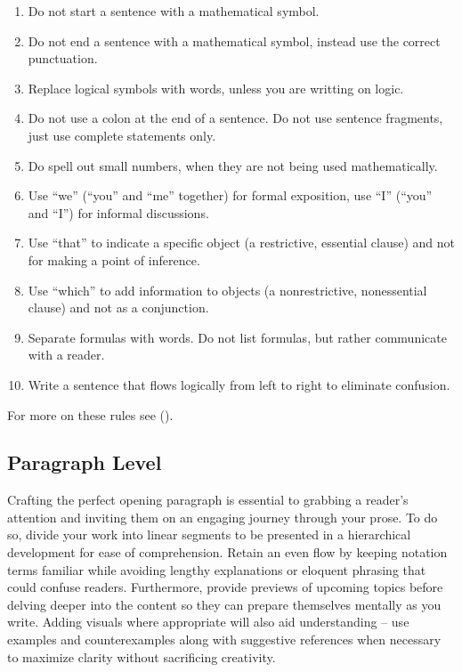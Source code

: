 \documentclass[
  twoside,
  12pt,
  letterpaper,
  fleqn]{article}
\providecommand{\tightlist}{%
  \setlength{\itemsep}{0pt}\setlength{\parskip}{0pt}}\usepackage{longtable,booktabs,array}
\begin{document}
\begin{enumerate}
\def\labelenumi{\arabic{enumi}.}
\tightlist
\item
  Do not start a sentence with a mathematical symbol.
\item
  Do not end a sentence with a mathematical symbol, instead use the
  correct punctuation.
\item
  Replace logical symbols with words, unless you are writting on logic.
\item
  Do not use a colon at the end of a sentence. Do not use sentence
  fragments, just use complete statements only.
\item
  Do spell out small numbers, when they are not being used
  mathematically.
\item
  Use ``we'' (``you'' and ``me'' together) for formal exposition, use
  ``I'' (``you'' and ``I'') for informal discussions.
\item
  Use ``that'' to indicate a specific object (a restrictive, essential
  clause) and not for making a point of inference.
\item
  Use ``which'' to add information to objects (a nonrestrictive,
  nonessential clause) and not as a conjunction.
\item
  Separate formulas with words. Do not list formulas, but rather
  communicate with a reader.
\item
  Write a sentence that flows logically from left to right to eliminate
  confusion.
\end{enumerate}

For more on these rules see (\textcite{knuth1989mathematical}).

\hypertarget{paragraph-level}{%
\subsection{Paragraph Level}\label{paragraph-level}}

Crafting the perfect opening paragraph is essential to grabbing a
reader's attention and inviting them on an engaging journey through your
prose. To do so, divide your work into linear segments to be presented
in a hierarchical development for ease of comprehension. Retain an even
flow by keeping notation terms familiar while avoiding lengthy
explanations or eloquent phrasing that could confuse readers.
Furthermore, provide previews of upcoming topics before delving deeper
into the content so they can prepare themselves mentally as you write.
Adding visuals where appropriate will also aid understanding -- use
examples and counterexamples along with suggestive references when
necessary to maximize clarity without sacrificing creativity.
\end{document}
